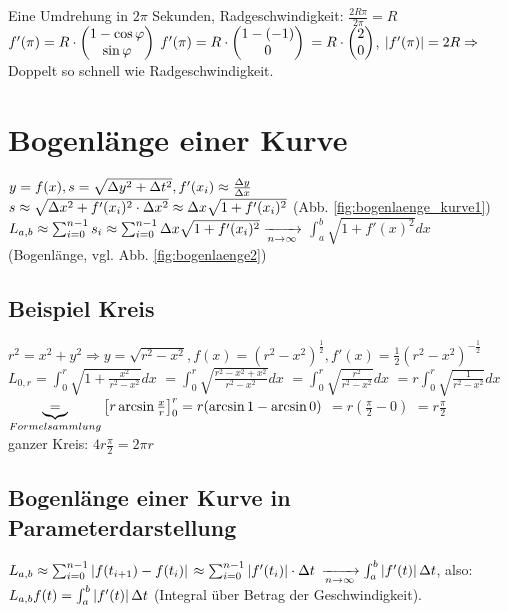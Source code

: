 Eine Umdrehung in $2\pi$ Sekunden, Radgeschwindigkeit: $\frac{2R\pi}{2\pi} =R$\\
$f'(\pi) = R\cdot  \begin{pmatrix} 1 - \cos \varphi\\\sin \varphi \end{pmatrix} $
$f'(\pi)=R\cdot  \begin{pmatrix} 1-(-1)\\0 \end{pmatrix} $
$=R\cdot  \begin{pmatrix} 2\\0 \end{pmatrix} $, 
$ \left\vert f'(\pi) \right\vert  = 2R \Rightarrow$ Doppelt so schnell wie Radgeschwindigkeit. 

\section{Bogenlänge einer Kurve}
$ y=f(x), s=\sqrt{\Delta y^2 + \Delta t^2}, f'(x_i)\approx \frac{\Delta y}{\Delta x}$\\
$s\approx \sqrt{\Delta x^2 + f'(x_i)^2 \cdot \Delta x^2} \approx \Delta x \sqrt{1+f'(x_i)^2}$ (Abb. \ref{fig:bogenlaenge_kurve1})\\
$L_{a,b} \approx \sum_{i=0}^{n-1} s_i \approx \sum_{i=0}^{n-1} \Delta x \sqrt{1+f'(x_i)^2} \xrightarrow[n\rightarrow \infty]{} $
$\int_{a}^{b} \sqrt{1+f'(x)^2} dx $ (Bogenlänge, vgl. Abb. \ref{fig:bogenlaenge2}) 


\subsection{Beispiel Kreis}
$r^2 = x^2 + y^2 \Rightarrow y = \sqrt{r^2 - x^2}, f(x)= (r^2-x^2)^{\frac{1}{2}}, f'(x) = \frac{1}{2}(r^2 - x^2)^{-\frac{1}{2}}$
$L_{0,r} = \int_{0}^{r} \sqrt{1+\frac{x^2}{r^2 - x^2}} dx$
$= \int_{0}^{r} \sqrt{\frac{r^2 - x^2 + x^2}{r^2-x^2}} dx$
$= \int_{0}^{r} \sqrt{\frac{r^2}{r^2 - x^2}} dx$
$= r \int_{0}^{r} \sqrt{\frac{1}{r^2 - x^2}} dx$
$\underbrace{=}_{Formelsammlung}   \left[ r \arcsin \frac{x}{r} \right] _0^r = r(\arcsin 1 - \arcsin 0)$
$= r(\frac{\pi}{2} - 0)$
$= r \frac{\pi}{2}$\\
ganzer Kreis: $4r \frac{\pi}{2} = 2\pi r$

\subsection{Bogenlänge einer Kurve in Parameterdarstellung}
$L_{a,b} \approx \sum_{i=0}^{n-1}  \left\vert f(t_{i+1}) - f(t_i) \right\vert  $
$\approx \sum_{i=0}^{n-1}  \left\vert f'(t_i) \right\vert  \cdot \Delta t $
$\xrightarrow[n\rightarrow \infty]{} \int_{a}^{b}  \left\vert f'(t) \right\vert  \Delta t$, also: \\
$L_{a,b} f(t) = \int_{a}^{b}  \left\vert f'(t) \right\vert  \Delta t $ (Integral über Betrag der Geschwindigkeit).

